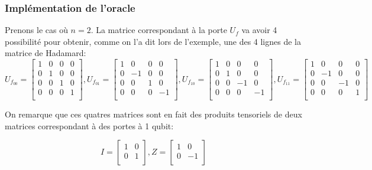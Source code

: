 \subsubsection*{Implémentation de l'oracle}

Prenons le cas où $n=2$. La matrice correspondant à la porte $U_f$ va avoir 4 possibilité pour obtenir, comme on l'a dit lors de l'exemple, une des 4 lignes de la matrice de Hadamard:
\[
U_{f_{00}} = 
\begin{bmatrix}
  1 & 0 & 0 & 0 \\
  0 & 1 & 0 & 0 \\
  0 & 0 & 1 & 0 \\
  0 & 0 & 0 & 1 \\
\end{bmatrix}
, U_{f_{01}} = 
\begin{bmatrix}
  1 & 0 & 0 & 0 \\
  0 & -1 & 0 & 0 \\
  0 & 0 & 1 & 0 \\
  0 & 0 & 0 & -1 \\
\end{bmatrix}
,U_{f_{10}} = 
\begin{bmatrix}
  1 & 0 & 0 & 0 \\
  0 & 1 & 0 & 0 \\
  0 & 0 & -1 & 0 \\
  0 & 0 & 0 & -1 \\
\end{bmatrix}
, U_{f_{11}} = 
\begin{bmatrix}
  1 & 0 & 0 & 0 \\
  0 & -1 & 0 & 0 \\
  0 & 0 & -1 & 0 \\
  0 & 0 & 0 & 1 \\
\end{bmatrix}
\]

On remarque que ces quatres matrices sont en fait des produits tensoriels de deux matrices correspondant à des portes à 1 qubit:

\[
  I = 
  \begin{bmatrix}
    1 & 0 \\
    0 & 1 \\
  \end{bmatrix}
  , Z = 
  \begin{bmatrix}
    1 & 0 \\
    0 & -1 \\
  \end{bmatrix}
\]

